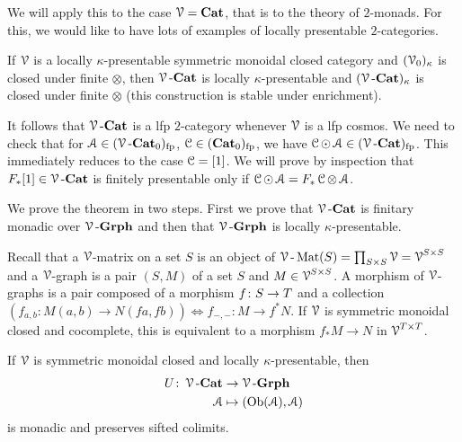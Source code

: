 \documentclass[a4paper,11pt,oneside,openany]{scrbook}
\begin{document}
We will apply this to the case $\V=\Cat$, that is to the theory of $2$-monads. For this, we would like to have lots of examples of locally presentable $2$-categories.
\begin{thm}\label{lkp}
If $\V$ is a locally $\kappa$-presentable symmetric monoidal closed category and $(\V_0)_\kappa$ is closed under finite $\otimes$, then $\V\mbox{-}\Cat$ is locally $\kappa$-presentable and $(\V\mbox{-}\Cat)_\kappa$ is closed under finite $\otimes$ (this construction is stable under enrichment).
\end{thm}
\begin{rmk}
   It follows that $\V\mbox{-}\Cat$ is a lfp $2$-category whenever $\V$ is a lfp cosmos. We need to check that for $\A\in(\V\mbox{-}\Cat_0)_{\text{fp}}$, $\C\in(\Cat_0)_{\text{fp}}$, we have $\C\copw\A\in(\V\mbox{-}\Cat)_{\text{fp}}$. This immediately reduces to the case $\C=[1]$. We will prove by inspection that $F_*[1]\in\V\mbox{-}\Cat$ is finitely presentable only if $\C\copw\A=F_*\C\otimes\A$.
\end{rmk}
We prove the theorem in two steps. First we prove that $\V\mbox{-}\Cat$ is finitary monadic over $\V\mbox{-}\mathbf{Grph}$ and then that $\V\mbox{-}\mathbf{Grph}$ is locally $\kappa$-presentable.
\par
Recall that a $\V$-matrix on a set $S$ is an object of $\V\mbox{-}\Mat(S)=\prod_{S\times S}\V=\V^{S\times S}$ and a $\V$-graph is a pair $(S,M)$ of a set $S$ and $M\in\V^{S\times S}$. A morphism of $\V$-graphs is a pair composed of a morphism $f\from S\rightarrow T$ and a collection $(f_{a,b}\colon M(a,b)\to N(fa,fb))\iff f_{-,-}\colon M\rightarrow f^*N$. If $\V$ is symmetric monoidal closed and cocomplete, this is equivalent to a morphism $f_*M\to N$ in $\V^{T\times T}$.
\begin{thm}
If $\V$ is symmetric monoidal closed and locally $\kappa$-presentable, then 
\begin{align*}
    U\colon\V\mbox{-}\Cat&\to\V\mbox{-}\mathbf{Grph}\\
    \A&\mapsto(\Ob(\A),\A)
\end{align*}
is monadic and preserves sifted colimits.
\end{thm}
\end{document}

